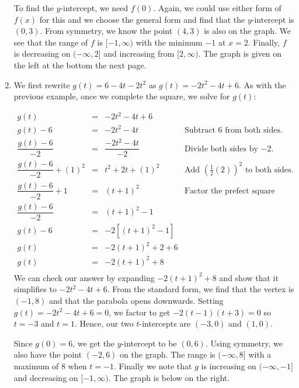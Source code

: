 \begin{ex}
\begin{enumerate}
\medskip

To find the $y$-intercept, we need $f(0)$.  Again, we could use either form of $f(x)$ for this and we choose the general form and find that the $y$-intercept is $(0,3)$.  From symmetry, we know the point  $(4,3)$ is also on the graph. We see that the range of $f$ is $[-1,\infty)$  with the minimum $-1$ at $x = 2$. Finally, $f$ is decreasing on $(-\infty, 2]$ and increasing from $[2, \infty)$. The graph is given on the left at the bottom the next page.

\item  We first rewrite $g(t) = 6 - 4t - 2t^2$ as $g(t)  = -2t^2 - 4t + 6$.  As with the previous example, once we complete the square, we solve for $g(t)$: 

\[ \begin{array}{rclr}

g(t) & = & -2t^2-4t+6 &  \\ [6pt]
g(t) - 6 & = & -2t^2-4t & \text{Subtract $6$ from both sides.} \\ [6pt]
\dfrac{g(t) - 6}{-2} & = & \dfrac{ -2t^2-4t }{-2}	& \text{Divide both sides by $-2$.}\\ [10pt]
\dfrac{g(t) - 6}{-2} + (1)^2 & = & t^2+2t +(1)^2	& \text{Add $\left( \frac{1}{2} (2) \right)^2$ to both sides.} \\ [10pt]
\dfrac{g(t) - 6}{-2} + 1 & = & (t+1)^2 & \text{Factor the prefect square trinomial.} \\ [10pt]
\dfrac{g(t) - 6}{-2}  & = & (t+1)^2 - 1 & \\ [10pt]
g(t) - 6 & = & -2 \left[ (t+1)^2-1 \right] & \\ [6pt]
g(t) & = & -2(t+1)^2 + 2 + 6 & \\ [6pt]
g(t) & = & -2(t+1)^2+8 \\
		 \end{array} \] We can check our answer by expanding  $-2(t+1)^2+8$ and show that it simplifies to  $-2t^2 - 4t+6$.  From the standard form, we find that the vertex is $(-1,8)$ and that the parabola opens downwards.  Setting $g(t) = -2t^2 - 4t+6= 0$, we factor to get $-2(t-1)(t+3) = 0$ so $t = -3$ and $t = 1$.  Hence, our two $t$-intercepts are $(-3,0)$ and $(1,0)$.  
		
\medskip
		
Since $g(0) = 6$, we get the $y$-intercept to be $(0,6)$.  Using symmetry, we also have the point $(-2,6)$ on the graph.  The range is $(-\infty, 8]$ with a maximum of $8$ when $t = -1$. Finally we note that $g$ is increasing on $(-\infty, -1]$ and decreasing on $[-1, \infty)$.  The graph is below on the right.


\end{enumerate}
\end{ex}
